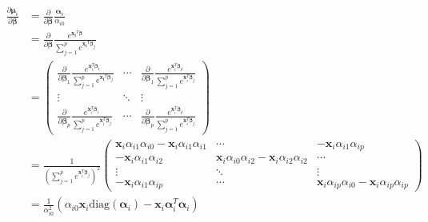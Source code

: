 \documentclass{article}
\begin{document}
\begin{align*}
  \frac{\partial  \boldsymbol\mu_i }{\partial \boldsymbol\beta} &= \frac{\partial  }{\partial \boldsymbol \beta} \frac{\boldsymbol\alpha_{i}}{\alpha_{i0}}\\
  &= \frac{\partial  }{\partial \boldsymbol \beta } \frac{e^{\mathbf{x_i}^T \boldsymbol\beta}}{\sum_{j = 1}^pe^{\mathbf{x_i}^T \boldsymbol\beta_j}}\\
  &= \begin{pmatrix}
        \frac{\partial }{\partial \boldsymbol\beta_1}\frac{e^{\mathbf{x}_i^T \boldsymbol\beta_1}}{\sum_{j = 1}^pe^{\mathbf{x_i}^T \boldsymbol\beta_j}} & \cdots & \frac{\partial  }{\partial \boldsymbol\beta_1}\frac{e^{\mathbf{x}_i^T \boldsymbol\beta_p}}{\sum_{j = 1}^pe^{\mathbf{x}_i^T \boldsymbol\beta_j}}\\
        \vdots & \ddots & \vdots \\
        \frac{\partial  }{\partial \boldsymbol\beta_p}\frac{e^{\mathbf{x}_i^T \boldsymbol\beta_1}}{\sum_{j = 1}^pe^{\mathbf{x}_i^T \boldsymbol\beta_j}} & \cdots & \frac{\partial  }{\partial \boldsymbol\beta_p}\frac{e^{\mathbf{x}_i^T \boldsymbol\beta_p}}{\sum_{j = 1}^pe^{\mathbf{x}_i^T \boldsymbol\beta_j}}
  \end{pmatrix}\\
  &= \frac{1}{\left(\sum_{j = 1}^pe^{\mathbf{x}_i^T \boldsymbol\beta_j} \right)^2} \begin{pmatrix}
\mathbf{x}_i \alpha_{i1} \alpha_{i0} - \mathbf{x}_i\alpha_{i1}\alpha_{i1} & \cdots & - \mathbf{x}_i\alpha_{i1}\alpha_{ip}\\
- \mathbf{x}_i\alpha_{i1}\alpha_{i2} & \mathbf{x}_i \alpha_{i0}\alpha_{i2} - \mathbf{x}_i\alpha_{i2}\alpha_{i2} & \cdots \\
\vdots & \ddots & \vdots\\
- \mathbf{x}_i \alpha_{i1}\alpha_{ip} & \cdots & \mathbf{x}_i\alpha_{ip}\alpha_{i0} - \mathbf{x}_i \alpha_{ip}\alpha_{ip}
  \end{pmatrix}\\
  &= \frac{1}{\alpha_{i0}^2} \left(\alpha_{i0} \mathbf{x}_i \text{diag}(\boldsymbol\alpha_i) - \mathbf{x}_i \boldsymbol\alpha_i^T \boldsymbol\alpha_i \right)
\end{align*}
\end{document}
